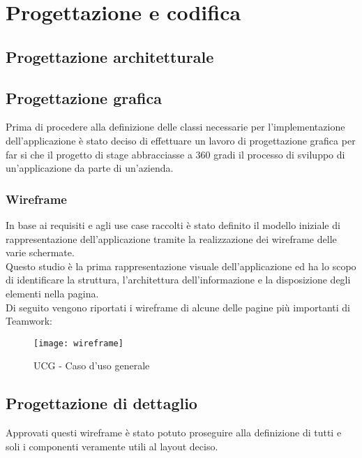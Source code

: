 
\chapter{Progettazione e codifica}\label{chap:design}

\section {Progettazione architetturale}

\section{Progettazione grafica}
Prima di procedere alla definizione delle classi necessarie per l'implementazione dell'applicazione è stato deciso di effettuare un lavoro di progettazione grafica per far si che il progetto di stage abbracciasse a 360 gradi il processo di sviluppo di un'applicazione da parte di un'azienda.
\subsection{Wireframe}
In base ai requisiti e agli use case raccolti è stato definito il modello iniziale di rappresentazione dell'applicazione tramite la realizzazione dei wireframe delle varie schermate. \\
Questo studio è la prima rappresentazione visuale dell'applicazione ed ha lo scopo di identificare la struttura, l'architettura dell'informazione e la disposizione degli elementi nella pagina.\\
Di seguito vengono riportati i wireframe di alcune delle pagine più importanti di Teamwork:

\begin{figure}[H] 
	\centering
	\texttt{[image: wireframe]}
	\caption{UCG - Caso d'uso generale}
\end{figure}


\section{Progettazione di dettaglio}
Approvati questi wireframe è stato potuto proseguire alla definizione di tutti e soli i componenti veramente utili al layout deciso.